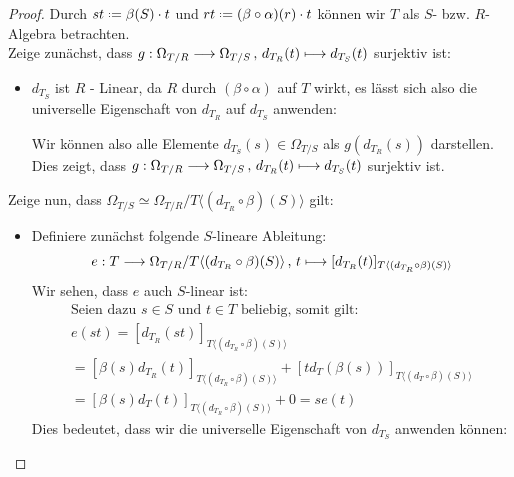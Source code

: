\documentclass[10pt,a4paper]{report}
\newcommand{\function}[5]{\nolinebreak{#1:#2 \longrightarrow #3 \, , \, #4 \longmapsto #5}}
\newcommand{\divR}[2]{\Omega_{#1/#2}}
\newcommand{\divf}[1]{d_{#1}}
\newcommand*{\defeq}{\mathrel{\vcenter{\baselineskip0.5ex \lineskiplimit0pt
                     \hbox{\scriptsize.}\hbox{\scriptsize.}}}%
                     =}
\begin{document}
\begin{proof}
Durch $st \defeq \beta (S) \cdot t$ und $rt \defeq (\beta \circ \alpha) (r) \cdot t$ können wir $T$ als $S$- bzw. $R$-Algebra betrachten.\\
Zeige zunächst, dass $\function{g}{\divR{T}{R}}{\divR{T}{S}}{\divf{T_R}(t)}{\divf{T_S}(t)}$ surjektiv ist:
\begin{itemize}
\item[]
$\divf{T_S}$ ist $R$ - Linear, da $R$ durch $(\beta \circ \alpha)$ auf $T$ wirkt, es lässt sich also die universelle Eigenschaft von $\divf{T_R}$ auf $\divf{T_S}$ anwenden:
\begin{center}
\end{center}
Wir können also alle Elemente $\divf{T_S}(s) \in \divR{T}{S}$ als $g(\divf{T_R}(s))$ darstellen.
Dies zeigt, dass $\function{g}{\divR{T}{R}}{\divR{T}{S}}{\divf{T_R}(t)}{\divf{T_S}(t)}$ surjektiv ist.
\end{itemize}
Zeige nun, dass $\divR{T}{S} \simeq \divR{T}{R}/T \langle (\divf{T_R} \circ \beta)(S) \rangle$ gilt:
\begin{itemize}
\item[] Definiere zunächst folgende $S$-lineare Ableitung:
\begin{gather*}
\function{e}{T}{\divR{T}{R} / T \langle (\divf{T_R} \circ \beta)(S) \rangle }{t}{[\divf{T_R}(t)]_{T \langle (\divf{T_R} \circ \beta)(S) \rangle}}
\end{gather*}
Wir sehen, dass $e$ auch $S$-linear ist:
\begin{gather*}
\text{Seien dazu } s \in S \text{ und } t \in T \text{ beliebig, somit gilt:}\\
e(st) = [\divf{T_R}(st)]_{T \langle (\divf{T_R} \circ \beta)(S) \rangle}\\
=[\beta(s) \divf{T_R}(t)]_{T \langle (\divf{T_R} \circ \beta)(S) \rangle} + [t \divf{T}(\beta(s))]_{T \langle (\divf{T} \circ \beta)(S) \rangle}\\
= [\beta(s) \divf{T}(t)]_{T \langle (\divf{T_R} \circ \beta)(S) \rangle} + 0 = se(t)
\end{gather*}
Dies bedeutet, dass wir die universelle Eigenschaft von $\divf{T_S}$ anwenden können:
\begin{center}

\end{center}
\end{itemize}
\end{proof}
\end{document}
